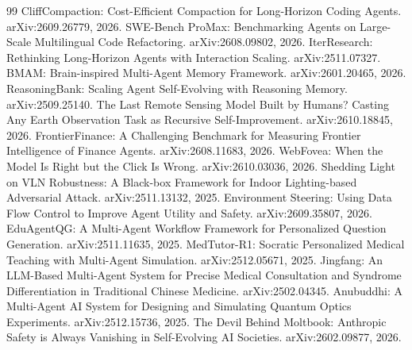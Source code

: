 \documentclass[10.5pt]{article}
\begin{document}
\begin{thebibliography}{99}
 CliffCompaction: Cost-Efficient Compaction for Long-Horizon Coding Agents. arXiv:2609.26779, 2026.
 SWE-Bench ProMax: Benchmarking Agents on Large-Scale Multilingual Code Refactoring. arXiv:2608.09802, 2026.
 IterResearch: Rethinking Long-Horizon Agents with Interaction Scaling. arXiv:2511.07327.
 BMAM: Brain-inspired Multi-Agent Memory Framework. arXiv:2601.20465, 2026.
 ReasoningBank: Scaling Agent Self-Evolving with Reasoning Memory. arXiv:2509.25140.
 The Last Remote Sensing Model Built by Humans? Casting Any Earth Observation Task as Recursive Self-Improvement. arXiv:2610.18845, 2026.
 FrontierFinance: A Challenging Benchmark for Measuring Frontier Intelligence of Finance Agents. arXiv:2608.11683, 2026.
 WebFovea: When the Model Is Right but the Click Is Wrong. arXiv:2610.03036, 2026.
 Shedding Light on VLN Robustness: A Black-box Framework for Indoor Lighting-based Adversarial Attack. arXiv:2511.13132, 2025.
 Environment Steering: Using Data Flow Control to Improve Agent Utility and Safety. arXiv:2609.35807, 2026.
 EduAgentQG: A Multi-Agent Workflow Framework for Personalized Question Generation. arXiv:2511.11635, 2025.
 MedTutor-R1: Socratic Personalized Medical Teaching with Multi-Agent Simulation. arXiv:2512.05671, 2025.
 Jingfang: An LLM-Based Multi-Agent System for Precise Medical Consultation and Syndrome Differentiation in Traditional Chinese Medicine. arXiv:2502.04345.
 Anubuddhi: A Multi-Agent AI System for Designing and Simulating Quantum Optics Experiments. arXiv:2512.15736, 2025.
 The Devil Behind Moltbook: Anthropic Safety is Always Vanishing in Self-Evolving AI Societies. arXiv:2602.09877, 2026.
\end{thebibliography}
\end{document}
